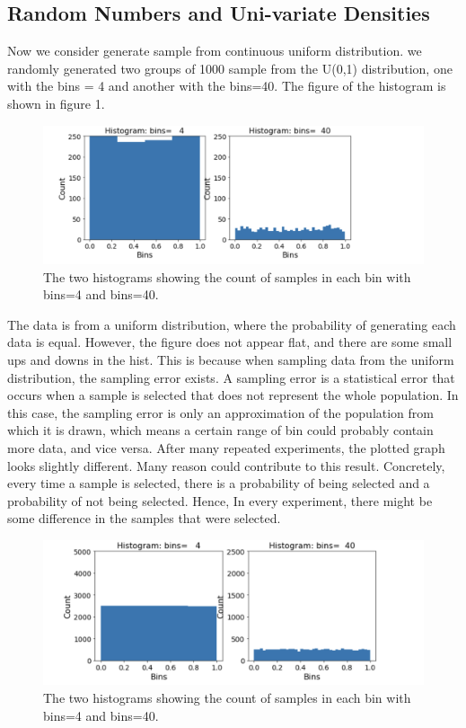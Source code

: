\documentclass[10pt]{article}
\begin{document}
\subsection{Random Numbers and Uni-variate Densities}

Now we consider generate sample from continuous uniform distribution. we randomly generated two groups of 1000 sample from the U(0,1) distribution, one with the bins = 4 and another with the bins=40. The figure of the histogram is shown in figure 1.

\begin{figure}
\vspace{-7mm}
\hspace{20mm}
\includegraphics[width=0.7\linewidth]{1000samples.png} 
\caption{\footnotesize The two histograms showing the count of samples in each bin with bins=4 and bins=40.}
\end{figure}

The data is from a uniform distribution, where the probability of generating each data is equal. However, the figure does not appear flat, and there are some small ups and downs in the hist. This is because when sampling data from the uniform distribution, the sampling error exists. A sampling error is a statistical error that occurs when a sample is selected that does not represent the whole population. In this case, the sampling error is only an approximation of the population from which it is drawn, which means a certain range of bin could probably contain more data, and vice versa. After many repeated experiments, the plotted graph looks slightly different. Many reason could contribute to this result. Concretely, every time a sample is selected, there is a probability of being selected and a probability of not being selected. Hence, In every experiment, there might be some difference in the samples that were selected.

\begin{figure}
\centering 
\vspace{-7mm}
\hspace{20mm}
\includegraphics[width=0.7\linewidth]{10000samples.png} 
\caption{\footnotesize The two histograms showing the count of samples in each bin with bins=4 and bins=40.}
\centering
\end{figure}
\end{document}
